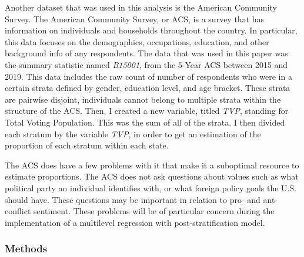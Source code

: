 \documentclass[
  11pt,
]{article}
\begin{document}
Another dataset that was used in this analysis is the American Community
Survey. The American Community Survey, or ACS, is a survey that has
information on individuals and households throughout the country. In
particular, this data focuses on the demographics, occupations,
education, and other background info of any respondents. The data that
was used in this paper was the summary statistic named \emph{B15001},
from the 5-Year ACS between 2015 and 2019. This data includes the raw
count of number of respondents who were in a certain strata defined by
gender, education level, and age bracket. These strata are pairwise
disjoint, individuals cannot belong to multiple strata within the
structure of the ACS. Then, I created a new variable, titled \emph{TVP},
standing for Total Voting Population. This was the sum of all of the
strata. I then divided each stratum by the variable \emph{TVP}, in order
to get an estimation of the proportion of each stratum within each
state.

The ACS does have a few problems with it that make it a suboptimal
resource to estimate proportions. The ACS does not ask questions about
values such as what political party an individual identifies with, or
what foreign policy goals the U.S. should have. These questions may be
important in relation to pro- and ant-conflict sentiment. These problems
will be of particular concern during the implementation of a multilevel
regression with post-stratification model.

\hypertarget{methods}{%
\subsubsection{Methods}\label{methods}}
\end{document}
